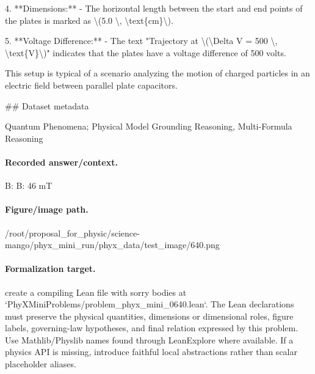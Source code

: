 4. **Dimensions:**
   - The horizontal length between the start and end points of the plates is marked as \textbackslash{}(5.0 \textbackslash{}, \textbackslash{}text\{cm\}\textbackslash{}).

5. **Voltage Difference:**
   - The text "Trajectory at \textbackslash{}(\textbackslash{}Delta V = 500 \textbackslash{}, \textbackslash{}text\{V\}\textbackslash{})" indicates that the plates have a voltage difference of 500 volts.

This setup is typical of a scenario analyzing the motion of charged particles in an electric field between parallel plate capacitors.

\#\# Dataset metadata

Quantum Phenomena; Physical Model Grounding Reasoning, Multi-Formula Reasoning

\paragraph{Recorded answer/context.}
B: B: 46 mT

\paragraph{Figure/image path.}
/root/proposal\_for\_physic/science-mango/phyx\_mini\_run/phyx\_data/test\_image/640.png

\paragraph{Formalization target.}
create a compiling Lean file with sorry bodies at `PhyXMiniProblems/problem\_phyx\_mini\_0640.lean`. The Lean declarations must preserve the physical quantities, dimensions or dimensional roles, figure labels, governing-law hypotheses, and final relation expressed by this problem.
Use Mathlib/Physlib names found through LeanExplore where available. If a physics API is missing, introduce faithful local abstractions rather than scalar placeholder aliases.

